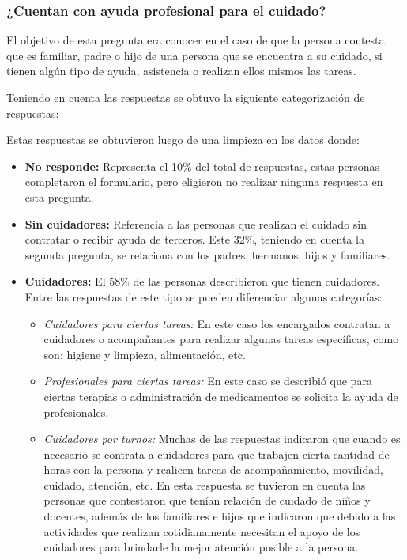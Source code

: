 \documentclass[a4paper,12pt]{article}
\newcommand{\saltolinea}{\par\vspace{\baselineskip}}
\begin{document}
    \subsubsection{¿Cuentan con ayuda profesional para el cuidado?}
    \par El objetivo de esta pregunta era conocer en el caso de que la persona contesta que es familiar, padre o hijo de una persona que se encuentra a su cuidado, si tienen algún tipo de ayuda, asistencia o realizan ellos mismos las tareas.
    \par Teniendo en cuenta las respuestas se obtuvo la siguiente categorización de respuestas:
    \newline
    \saltolinea
    \par Estas respuestas se obtuvieron luego de una limpieza en los datos donde:
    \begin{itemize}
        \item \textbf{No responde:} Representa el 10\% del total de respuestas, estas personas completaron el formulario, pero eligieron no realizar ninguna respuesta en esta pregunta.
        \item \textbf{Sin cuidadores:} Referencia a las personas que realizan el cuidado sin contratar o recibir ayuda de terceros. Este 32\%, teniendo en cuenta la segunda pregunta, se relaciona con los padres, hermanos, hijos y familiares. 
        \item \textbf{Cuidadores:} El 58\% de las personas describieron que tienen cuidadores. Entre las respuestas de este tipo se pueden diferenciar algunas categorías:
        \begin{itemize}
            \item \textit{Cuidadores para ciertas tareas:} En este caso los encargados contratan a cuidadores o acompañantes para realizar algunas tareas específicas, como son: higiene y limpieza, alimentación, etc.
            \item \textit{Profesionales para ciertas tareas:} En este caso se describió que para ciertas terapias o administración de medicamentos se solicita la ayuda de profesionales.
            \item \textit{Cuidadores por turnos:} Muchas de las respuestas indicaron que cuando es necesario se contrata a cuidadores para que trabajen cierta cantidad de horas con la persona y realicen tareas de acompañamiento, movilidad, cuidado, atención, etc. En esta respuesta se tuvieron en cuenta las personas que contestaron que tenían relación de cuidado de niños y docentes, además de los familiares e hijos que indicaron que debido a las actividades que realizan cotidianamente necesitan el apoyo de los cuidadores para brindarle la mejor atención posible a la persona.
        \end{itemize}
    \end{itemize}
\end{document}
